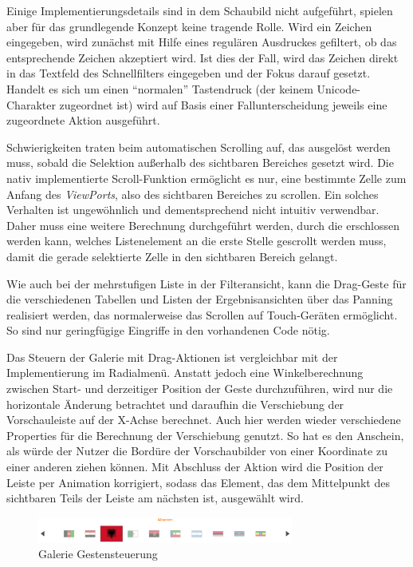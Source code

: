 Einige Implementierungsdetails sind in dem Schaubild nicht aufgeführt, spielen aber für das grundlegende Konzept keine tragende Rolle. Wird ein Zeichen eingegeben, wird zunächst mit Hilfe eines regulären Ausdruckes gefiltert, ob das entsprechende Zeichen akzeptiert wird. Ist dies der Fall, wird das Zeichen direkt in das Textfeld des Schnellfilters eingegeben und der Fokus darauf gesetzt. Handelt es sich um einen \enquote{normalen} Tastendruck (der keinem Unicode-Charakter zugeordnet ist) wird auf Basis einer Fallunterscheidung jeweils eine zugeordnete Aktion ausgeführt.\par
Schwierigkeiten traten beim automatischen Scrolling auf, das ausgelöst werden muss, sobald die Selektion außerhalb des sichtbaren Bereiches gesetzt wird. Die nativ implementierte Scroll-Funktion ermöglicht es nur, eine bestimmte Zelle zum Anfang des \textit{ViewPorts}, also des sichtbaren Bereiches zu scrollen. Ein solches Verhalten ist ungewöhnlich und dementsprechend nicht intuitiv verwendbar. Daher muss eine weitere Berechnung durchgeführt werden, durch die erschlossen werden kann, welches Listenelement an die erste Stelle gescrollt werden muss, damit die gerade selektierte Zelle in den sichtbaren Bereich gelangt.\par
{}
Wie auch bei der mehrstufigen Liste in der Filteransicht, kann die Drag-Geste für die verschiedenen Tabellen und Listen der Ergebnisansichten über das Panning realisiert werden, das normalerweise das Scrollen auf Touch-Geräten ermöglicht. So sind nur geringfügige Eingriffe in den vorhandenen Code nötig.\par
Das Steuern der Galerie mit Drag-Aktionen ist vergleichbar mit der Implementierung im Radialmenü. Anstatt jedoch eine Winkelberechnung zwischen Start- und derzeitiger Position der Geste durchzuführen, wird nur die horizontale Änderung betrachtet und daraufhin die Verschiebung der Vorschauleiste auf der X-Achse berechnet. Auch hier werden wieder verschiedene Properties für die Berechnung der Verschiebung genutzt. So hat es den Anschein, als würde der Nutzer die Bordüre der Vorschaubilder von einer Koordinate zu einer anderen ziehen können. Mit Abschluss der Aktion wird die Position der Leiste per Animation korrigiert, sodass das Element, das dem Mittelpunkt des sichtbaren Teils der Leiste am nächsten ist, ausgewählt wird.\par
\begin{figure}[H]
 \centering
 \includegraphics[width=0.75\textwidth]{grafiken/gallery_drag.png}
 \caption{Galerie Gestensteuerung}
 \label{fig:mllKeyCapture}
\end{figure}
